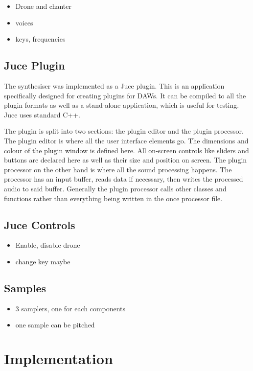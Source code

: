 \documentclass[12pt]{article}
\begin{document}
	\begin{itemize}
		\item Drone and chanter
		\item voices
		\item keys, frequencies
	\end{itemize}
	
	
	\subsection{Juce Plugin}
	The synthesiser was implemented as a Juce plugin. This is an application specifically designed for creating plugins for DAWs. 
	It can be compiled to all the plugin formats as well as a stand-alone application, which is useful for testing. Juce uses standard C++.
	
	The plugin is split into two sections: the plugin editor and the plugin processor. The plugin editor is where all the user interface elements go. 
	The dimensions and colour of the plugin window is defined here. All on-screen controls like sliders and buttons are declared here as well as their size and position on screen.
	The plugin processor on the other hand is where all the sound processing happens. The processor has an input buffer, reads data if necessary, then writes the processed
	audio to said buffer. Generally the plugin processor calls other classes and functions rather than everything being written in the once processor file.
		
	\subsection{Juce Controls}
	\begin{itemize}
		\item Enable, disable drone
		\item change key maybe
	\end{itemize}
	
	\subsection{Samples}
	\begin{itemize}
		\item 3 samplers, one for each components
		\item one sample can be pitched
	\end{itemize}
	
		
\section{Implementation}
	
\end{document}
